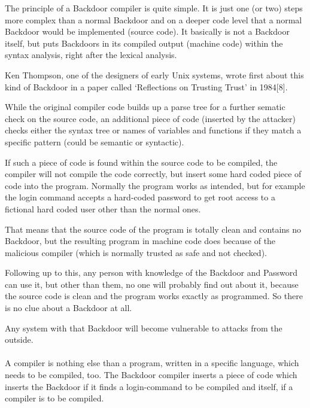 \documentclass[a4paper, 12pt]{article}
\begin{document}
The principle of a Backdoor compiler is quite simple. It is just one (or two) steps more complex than a normal Backdoor and on a deeper code level that a normal Backdoor would be implemented (source code).
It basically is not a Backdoor itself, but puts Backdoors in its compiled output (machine code) within the syntax analysis, right after the lexical analysis.

Ken Thompson, one of the designers of early Unix systems, wrote first about this kind of Backdoor in a paper called `Reflections on Trusting Trust' in 1984[8].

While the original compiler code builds up a parse tree for a further sematic check on the source code, an additional piece of code (inserted by the attacker) checks either the syntax tree or names of variables and functions if they match a specific pattern (could be semantic or syntactic).

If such a piece of code is found within the source code to be compiled, the compiler will not compile the code correctly, but insert some hard coded piece of code into the program. Normally the program works as intended, but for example the login command accepts a hard-coded password to get root access to a fictional hard coded user other than the normal ones.

That means that the source code of the program is totally clean and contains no Backdoor, but the resulting program in machine code does because of the malicious compiler (which is normally trusted as safe and not checked).

Following up to this, any person with knowledge of the Backdoor and Password can use it, but other than them, no one will probably find out about it, because the source code is clean and the program works exactly as programmed. So there is no clue about a Backdoor at all.

Any system with that Backdoor will become vulnerable to attacks from the outside.
\\
\\
A compiler is nothing else than a program, written in a specific language, which needs to be compiled, too. The Backdoor compiler inserts a piece of code which inserts the Backdoor if it finds a login-command to be compiled and itself, if a compiler is to be compiled.

\newpage
\end{document}
